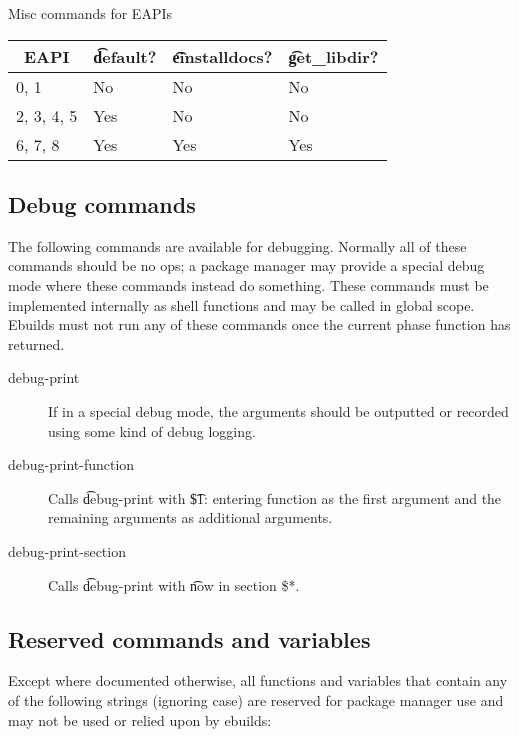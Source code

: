 \begin{centertable}{Misc commands for EAPIs}
    \label{tab:misc-commands}
    \begin{tabular}{llll}
      \toprule
      \multicolumn{1}{c}{\textbf{EAPI}} &
      \multicolumn{1}{c}{\textbf{\t{default}?}} &
      \multicolumn{1}{c}{\textbf{\t{einstalldocs}?}} &
      \multicolumn{1}{c}{\textbf{\t{get_libdir}?}} \\
      \midrule
      0, 1              & No  & No  & No  \\
      2, 3, 4, 5        & Yes & No  & No  \\
      6, 7, 8           & Yes & Yes & Yes \\
      \bottomrule
    \end{tabular}
\end{centertable}

\subsection{Debug commands}
The following commands are available for debugging. Normally all of these commands should be no ops;
a package manager may provide a special debug mode where these commands instead do something.
These commands must be implemented internally as shell functions and may be called in global scope.
Ebuilds must not run any of these commands once the current phase function has returned.

\begin{description}
\item[debug-print] If in a special debug mode, the arguments should be outputted or recorded using
    some kind of debug logging.
\item[debug-print-function] Calls \t{debug-print} with \t{\$1: entering function} as the first
    argument and the remaining arguments as additional arguments.
\item[debug-print-section] Calls \t{debug-print} with \t{now in section \$*}.
\end{description}

\subsection{Reserved commands and variables}

Except where documented otherwise, all functions and variables that contain any of the following
strings (ignoring case) are reserved for package manager use and may not be used or relied upon by
ebuilds:

